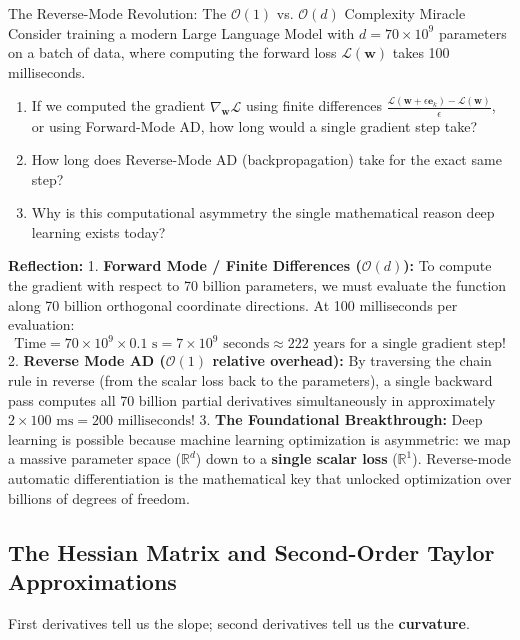 \begin{ponderbox}{The Reverse-Mode Revolution: The $\mathcal{O}(1)$ vs. $\mathcal{O}(d)$ Complexity Miracle}
Consider training a modern Large Language Model with $d = 70 \times 10^9$ parameters on a batch of data, where computing the forward loss $\mathcal{L}(\mathbf{w})$ takes 100 milliseconds.
\begin{enumerate}
    \item If we computed the gradient $\nabla_{\mathbf{w}} \mathcal{L}$ using finite differences $\frac{\mathcal{L}(\mathbf{w} + \epsilon \mathbf{e}_k) - \mathcal{L}(\mathbf{w})}{\epsilon}$, or using Forward-Mode AD, how long would a single gradient step take?
    \item How long does Reverse-Mode AD (backpropagation) take for the exact same step?
    \item Why is this computational asymmetry the single mathematical reason deep learning exists today?
\end{enumerate}
\tcblower
\textbf{Reflection:}
1. \textbf{Forward Mode / Finite Differences ($\mathcal{O}(d)$):} To compute the gradient with respect to 70 billion parameters, we must evaluate the function along 70 billion orthogonal coordinate directions. At 100 milliseconds per evaluation:
\begin{equation*}
\text{Time} = 70 \times 10^9 \times 0.1\text{ s} = 7 \times 10^9\text{ seconds} \approx 222\text{ years for a single gradient step!}
\end{equation*}
2. \textbf{Reverse Mode AD ($\mathcal{O}(1)$ relative overhead):} By traversing the chain rule in reverse (from the scalar loss back to the parameters), a single backward pass computes all 70 billion partial derivatives simultaneously in approximately $2 \times 100\text{ ms} = 200\text{ milliseconds}$!
3. \textbf{The Foundational Breakthrough:} Deep learning is possible because machine learning optimization is asymmetric: we map a massive parameter space ($\mathbb{R}^d$) down to a \textbf{single scalar loss} ($\mathbb{R}^1$). Reverse-mode automatic differentiation is the mathematical key that unlocked optimization over billions of degrees of freedom.
\end{ponderbox}

\subsection{The Hessian Matrix and Second-Order Taylor Approximations}
First derivatives tell us the slope; second derivatives tell us the \textbf{curvature}.

